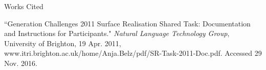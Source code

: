 \documentclass[12pt,letterpaper]{article}
\newenvironment{workscited}{
  \newcommand{\bibentry}{\noindent{}\hangindent=0.5in}
  \newpage{}
  {\centering{}Works Cited\par{}}
}{\newpage{}}
\begin{document}
\begin{flushleft}
\begin{workscited}
    \bibentry{}``Generation Challenges 2011 Surface Realisation Shared Task: Documentation and Instructions for Participants." \textit{Natural Language Technology Group}, University of Brighton, 19 Apr. 2011, www.itri.brighton.ac.uk/home/Anja.Belz/pdf/SR-Task-2011-Doc.pdf. Accessed 29 Nov. 2016.
  \end{workscited}
\end{flushleft}
\end{document}
